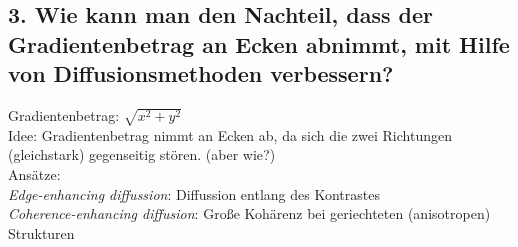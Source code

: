 \subsection*{3. Wie kann man den Nachteil, dass der Gradientenbetrag an Ecken abnimmt, mit Hilfe von  Diffusionsmethoden verbessern?}
Gradientenbetrag: $\sqrt{x^{2}+y^{2}}$ \\
Idee: Gradientenbetrag nimmt an Ecken ab, da sich die zwei Richtungen (gleichstark) gegenseitig st\"oren. (aber wie?) \\
Ans\"atze:  \\
\emph{Edge-enhancing diffussion}: Diffussion entlang des Kontrastes \\
\emph{Coherence-enhancing diffusion}: Gro{\ss}e Koh\"arenz bei geriechteten (anisotropen) Strukturen